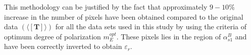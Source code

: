 This methodology can be justified by the fact that approximately $9-10\%$ increase in the number of pixels have been obtained compared to the original data $(\langle[{\mathbf{T}}]\rangle)$ for all the data sets used in this study by using the criteria of optimum degree of polarization $m_{E}^{opt}$. These pixels lies in the region of $\alpha_{s1}^{B}$ and have been correctly inverted to obtain $\varepsilon_{r}$. 

%
%
